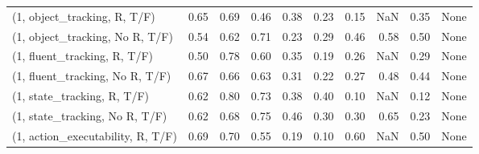 \begin{table*}[h!]
\begin{adjustbox}{width=2\columnwidth,center}
\begin{tabular}{lrrr|rrr|rrr}
\midrule
(1, object\_tracking, R, T/F)         &                      0.65 &                  0.69 &                      0.46 &                          0.38 &                      0.23 &                          0.15 &                                    NaN &                               0.35 &                                  None \\
(1, object\_tracking, No R, T/F)      &                      0.54 &                  0.62 &                      0.71 &                          0.23 &                      0.29 &                          0.46 &                                   0.58 &                               0.50 &                                  None \\
(1, fluent\_tracking, R, T/F)         &                      0.50 &                  0.78 &                      0.60 &                          0.35 &                      0.19 &                          0.26 &                                    NaN &                               0.29 &                                  None \\
(1, fluent\_tracking, No R, T/F)      &                      0.67 &                  0.66 &                      0.63 &                          0.31 &                      0.22 &                          0.27 &                                   0.48 &                               0.44 &                                  None \\
(1, state\_tracking, R, T/F)          &                      0.62 &                  0.80 &                      0.73 &                          0.38 &                      0.40 &                          0.10 &                                    NaN &                               0.12 &                                  None \\
(1, state\_tracking, No R, T/F)       &                      0.62 &                  0.68 &                      0.75 &                          0.46 &                      0.30 &                          0.30 &                                   0.65 &                               0.23 &                                  None \\
(1, action\_executability, R, T/F)    &                      0.69 &                  0.70 &                      0.55 &                          0.19 &                      0.10 &                          0.60 &                                    NaN &                               0.50 &                                  None \\

\end{tabular}
\end{adjustbox}
\end{table*}
